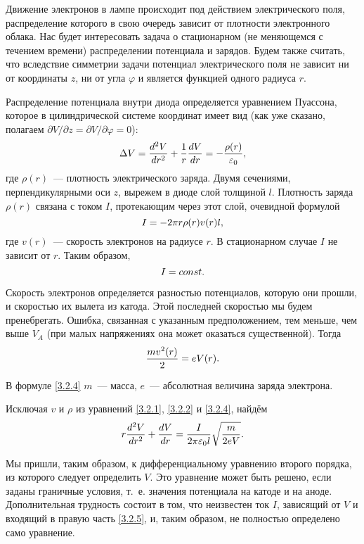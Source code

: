 Движение электронов в лампе происходит под действием электрического поля, распределение которого в свою очередь зависит от плотности электронного облака. Нас будет интересовать задача о стационарном (не меняющемся с течением времени) распределении потенциала и зарядов. Будем также считать, что вследствие симметрии задачи потенциал электрического поля не зависит ни от координаты $z$, ни от угла $\varphi$ и является функцией одного радиуса $r$.

Распределение потенциала внутри диода определяется уравнением Пуассона, которое в цилиндрической системе координат имеет вид (как уже сказано, полагаем $\partial V/\partial z=\partial V/\partial\varphi=0$):
\begin{equation}
	\Delta V=\frac{d^2 V}{dr^2}+\frac{1}{r}\frac{dV}{dr}=-\frac{\rho(r)}{\varepsilon_0},
	\eqmark{3.2.1}
\end{equation}
где $\rho(r)$~--- плотность электрического заряда. Двумя сечениями, перпендикулярными оси $z$, вырежем в диоде слой
толщиной $l$. Плотность заряда $\rho(r)$ связана с током $I$, протекающим через этот слой, очевидной формулой
\begin{equation}
	I=-2\pi r\rho(r)v(r)l,
	\eqmark{3.2.2}
\end{equation}
где $v(r)$~--- скорость электронов на радиусе $r$. В стационарном случае $I$ не зависит от $r$. Таким образом,
\begin{equation}
	I=const.
	\eqmark{3.2.3}
\end{equation}

Скорость электронов определяется разностью потенциалов, которую они прошли, и скоростью их вылета из катода. Этой
последней скоростью мы будем пренебрегать. Ошибка, связанная с указанным предположением, тем меньше, чем выше $V_A$ (при малых напряжениях она может оказаться существенной). Тогда
\begin{equation}
	\frac{mv^2(r)}{2}=eV(r).
	\eqmark{3.2.4}
\end{equation}

В формуле \eqref{3.2.4} $m$~--- масса, $e$~--- абсолютная величина заряда электрона.

Исключая $v$ и $\rho$ из уравнений \eqref{3.2.1}, \eqref{3.2.2} и \eqref{3.2.4}, найдём
\begin{equation}
	r\frac{d^2V}{dr^2}+\frac{dV}{dr}=\frac{I}{2\pi\varepsilon_0l}\sqrt{\frac{m}{2eV}}.
	\eqmark{3.2.5}
\end{equation}

Мы пришли, таким образом, к дифференциальному уравнению второго порядка, из которого следует определить $V$. Это
уравнение может быть решено, если заданы граничные условия, т.~е. значения потенциала на катоде и на аноде.
Дополнительная трудность состоит в том, что неизвестен ток $I$, зависящий от $V$ и входящий в правую часть \eqref{3.2.5}, и, таким образом, не полностью определено само уравнение.

